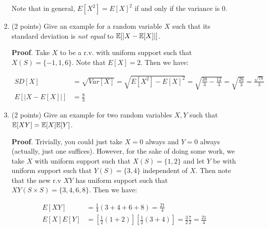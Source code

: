 \documentclass{article}
\begin{document}
\begin{enumerate}
\begin{enumerate}[,label=\alph*.]
Note that in general, $E[X^2] = E[X]^2$ if and only if the variance is $0$.
\mdfloatright{\ensuremath{\Box}}%

\item{}
(2 points) Give an example for a random variable $X$ such that its standard deviation is \emph{not 
equal} to $\mathbb{E}[ | X - \mathbb{E}[X] | ]$.%

\begin{mdbmarginx}{1ex}{0pt}{1ex}{0pt}%
\noindent{}\textbf{Proof}.  Take $X$ to be a r.v. with uniform support such that $X(S) = \{-1,1,6\}$. Note that $E[X] = 2$. 
Then we have:%
\end{mdbmarginx}%
\noindent\noindent\[%
\begin{aligned}
SD[X] &= \sqrt{Var[X]} = \sqrt{E[X^2] - E[X]^2} = \sqrt{\frac{38}{3} - \frac{12}{3}} = 
\sqrt{\frac{26}{3}} = \frac{\sqrt{78}}{3} \\
E[|X -E[X]|] &= \frac{8}{3}
\end{aligned}
\]%

\mdfloatright{\ensuremath{\Box}}%

\item{}
(2 points) Give an example for two random variables $X,Y$ such that $\mathbb{E}[XY] = \mathbb{E}[X]\mathbb{E}[Y]$.%

\begin{mdbmarginx}{1ex}{0pt}{1ex}{0pt}%
\noindent{}\textbf{Proof}.  Trivially, you could just take $X = 0$ always and $Y = 0$ always (actually, just one suffices). 
However, for the sake of doing some work, we take $X$ with uniform support such that 
$X(S) = \{1,2\}$ and let $Y$ be with uniform support such that $Y(S) = \{3,4\}$ independent of 
$X$. Then note that the new r.v $XY$ has uniform support such that $XY(S \times S) = \{3,4,6,8\}$. 
Then we have:%
\end{mdbmarginx}%
\noindent\noindent\[%
\begin{aligned}
E[XY] &= \frac{1}{4} (3 + 4 + 6 + 8) = \frac{21}{4} \\
E[X]E[Y] &= \left[\frac{1}{2}(1 + 2) \right] \left[\frac{1}{2} ( 3 + 4) \right] = 
\frac{3}{2}\frac{7}{2} = \frac{21}{4}
\end{aligned}
\]%


\end{enumerate}
\end{enumerate}
\end{document}
